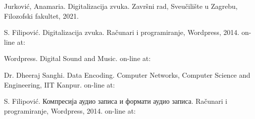 \documentclass[a4paper]{article}
\begin{document}
\appendix

\begin{thebibliography}{9}

 Jurković, Anamaria. Digitalizacija zvuka.  Završni rad, Sveučilište u Zagrebu, Filozofski fakultet, 2021.

 S. Filipović. Digitalizacija zvuka. Računari i programiranje, Wordpress, 2014. on-line at:

 Wordpress. Digital Sound and Music. on-line at:

\bibitem{} Dr. Dheeraj Sanghi. Data Encoding. Computer Networks, Computer Science and Engineering, IIT Kanpur. on-line at:

\bibitem{} S. Filipović. Компресија аудио записа и формати аудио записа. Računari i programiranje, Wordpress, 2014. on-line at:

\end{thebibliography}
\end{document}
